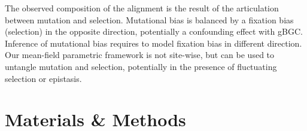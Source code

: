 \begin{table}[H]
    \centering
    \noindent{}
    \caption[Estimated parameters]{
    Nucleoprotein alignment of 498 amino-acids available for 180 species (left column).
    Lactamase alignment of 263 amino-acids available for 85 species (right column).
    }
\end{table}

The observed composition of the alignment is the result of the articulation between mutation and selection.
Mutational bias is balanced by a fixation bias (selection) in the opposite direction, potentially a confounding effect with gBGC.
Inference of mutational bias requires to model fixation bias in different direction.
Our mean-field parametric framework is not site-wise, but can be used to untangle mutation and selection, potentially in the presence of fluctuating selection or epistasis.


\section{Materials \& Methods}


